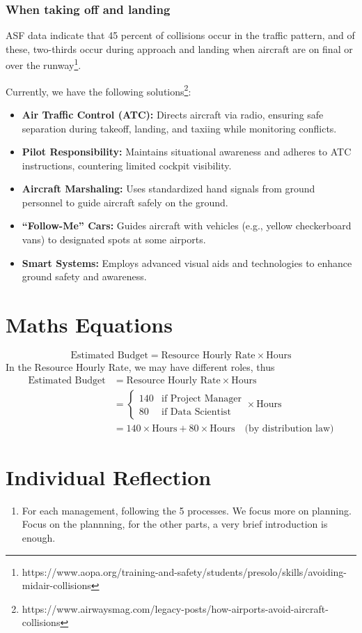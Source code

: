 \documentclass[math,code]{amznotes}
\theoremstyle{remark}
\begin{document}
\subsubsection{When taking off and landing}
ASF data indicate that 45 percent of collisions occur in the traffic pattern, and of these, two-thirds occur during approach and landing when aircraft are on final or over the runway\footnote{https://www.aopa.org/training-and-safety/students/presolo/skills/avoiding-midair-collisions}. 

Currently, we have the following solutions\footnote{https://www.airwaysmag.com/legacy-posts/how-airports-avoid-aircraft-collisions}:
\begin{itemize}
    \item \textbf{Air Traffic Control (ATC):} Directs aircraft via radio, ensuring safe separation during takeoff, landing, and taxiing while monitoring conflicts.
    \item \textbf{Pilot Responsibility:} Maintains situational awareness and adheres to ATC instructions, countering limited cockpit visibility.
    \item \textbf{Aircraft Marshaling:} Uses standardized hand signals from ground personnel to guide aircraft safely on the ground.
    \item \textbf{``Follow-Me'' Cars:} Guides aircraft with vehicles (e.g., yellow checkerboard vans) to designated spots at some airports.
    \item \textbf{Smart Systems:} Employs advanced visual aids and technologies to enhance ground safety and awareness.
\end{itemize}

\section{Maths Equations}
\begin{equation}
    \text{Estimated Budget}=\text{Resource Hourly Rate}\times \text{Hours}
\end{equation}
In the Resource Hourly Rate, we may have different roles, thus
\begin{align*}
    \text{Estimated Budget}&=\text{Resource Hourly Rate}\times \text{Hours}\\
    &=
    \begin{cases}
        140 & \text{if Project Manager} \\
        80 & \text{if Data Scientist}
    \end{cases}
    \times \text{Hours} \\
    &=140\times \text{Hours} + 80\times \text{Hours}
    \quad \text{(by distribution law)}
\end{align*}

\section{Individual Reflection}
\begin{enumerate}
    \item For each management, following the 5 processes. We focus more on planning. Focus on the plannning, for the other parts, a very brief introduction is enough.
\end{enumerate}
\end{document}
